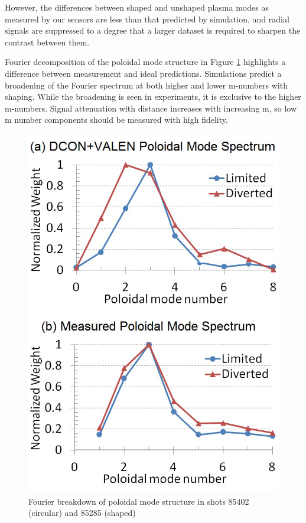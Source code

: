 \documentclass[aps,preprint,showpacs,superscriptaddress,groupedaddress]{revtex4}  %
\begin{document}
However, the differences between shaped and unshaped plasma modes as measured by our sensors are less than that predicted by simulation, and radial signals are suppressed to a degree that a larger dataset is required to sharpen the contrast between them.\par
	Fourier decomposition of the poloidal mode structure in Figure \ref{mike_mode_structure} highlights a difference between measurement and ideal predictions.  Simulations predict a broadening of the Fourier spectrum at both higher and lower m-numbers with shaping.  While the broadening is seen in experiments, it is exclusive to the higher m-numbers.  Signal attenuation with distance increases with increasing m, so low m number components should be measured with high fidelity.\par
	\begin{figure}[htb]
	\centering
\includegraphics[scale=.5]{../Plots/fig2_mode_spectrum_REV2.png}\caption{Fourier breakdown of poloidal mode structure in shots 85402 (circular) and 85285 (shaped)}
	\label{mike_mode_structure}
	\end{figure}
\end{document}
